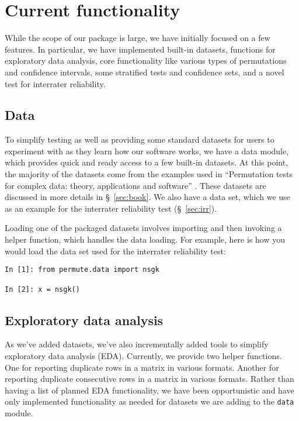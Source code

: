 \chapter{\label{ch:func}Current functionality}

While the scope of our package is large, we have initially focused on a
few features.  In particular, we have implemented built-in datasets,
functions for exploratory data analysis, core functionality like various
types of permutations and confidence intervals, some stratified tests
and confidence sets, and a novel test for interrater reliability.

\section{Data}

To simplify testing as well as providing some standard datasets for
users to experiment with as they learn how our software works, we
have a data module, which provides quick and ready access to a few
built-in datasets. At this point, the majority of the datasets come
from the examples used in ``Permutation tests for complex data: theory,
applications and software'' \cite{pesarin2010permutation}.  These
datasets are discussed in more details in \S~\ref{sec:book}.  We also
have a data set, which we use as an example for the interrater
reliability test (\S~\ref{sec:irr}).

Loading one of the packaged datasets involves importing and then
invoking a helper function, which handles the data loading.  For
example, here is how you would load the data set used for the
interrater reliability test:
\begin{verbatim}
In [1]: from permute.data import nsgk

In [2]: x = nsgk()
\end{verbatim} 

\section{Exploratory data analysis}

As we've added datasets, we've also incrementally added tools to simplify
exploratory data analysis (EDA).  Currently, we provide two helper functions.
One for reporting duplicate rows in a matrix in various formats.  Another for
reporting duplicate consecutive rows in a matrix in various formats.  Rather
than having a list of planned EDA functionality, we have been opportunistic
and have only implemented functionality as needed for datasets we are adding
to the \texttt{data} module.

